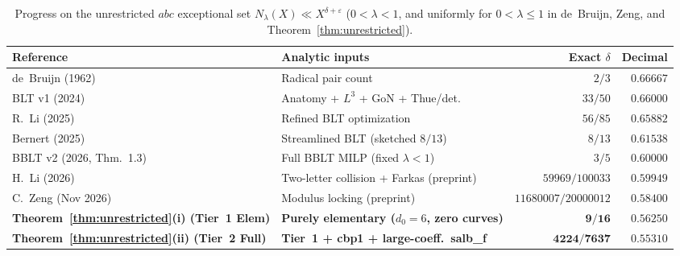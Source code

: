 \documentclass[11pt,a4paper]{amsart}
\theoremstyle{plain}
\theoremstyle{definition}
\theoremstyle{remark}
\newcommand{\eps}{\varepsilon}
\begin{document}
\begin{table}[ht]
\centering
\caption{Progress on the unrestricted $abc$ exceptional set $N_\lambda(X) \ll X^{\delta+\eps}$ ($0 < \lambda < 1$, and uniformly for $0 < \lambda \le 1$ in de~Bruijn, Zeng, and Theorem~\ref{thm:unrestricted}).}
\label{tab:history}
\footnotesize
\setlength{\tabcolsep}{2.8pt}
\begin{tabular}{@{}llrr@{}}
\toprule
Reference & Analytic inputs & Exact $\delta$ & Decimal \\
\midrule
de~Bruijn (1962)~\cite{deBruijn1962} & Radical pair count & $2/3$ & $0.66667$ \\
BLT v1 (2024)~\cite{BLTv1_2024} & Anatomy + $L^3$ + \textsf{GoN} + Thue/det. & $33/50$ & $0.66000$ \\
R.~Li (2025)~\cite{Li2025} & Refined BLT optimization & $56/85$ & $0.65882$ \\
Bernert (2025)~\cite{Bernert2025} & Streamlined BLT (sketched $8/13$) & $8/13$ & $0.61538$ \\
BBLT v2 (2026, Thm.~1.3)~\cite{BLT2026} & Full BBLT MILP (fixed $\lambda < 1$) & $3/5$ & $0.60000$ \\
H.~Li (2026)~\cite{HongminLi2026} & Two-letter collision + Farkas (preprint) & $59969/100033$ & $0.59949$ \\
C.~Zeng (Nov 2026)~\cite{Zeng2026} & Modulus locking (preprint) & $11680007/20000012$ & $0.58400$ \\
\midrule
\textbf{Theorem~\ref{thm:unrestricted}(i) (Tier~1 Elem)} & \textbf{Purely elementary ($d_0=6$, zero curves)} & $\mathbf{9/16}$ & $\mathbf{0.56250}$ \\
\textbf{Theorem~\ref{thm:unrestricted}(ii) (Tier~2 Full)} & \textbf{Tier~1 + \textsf{cbp1} + large-coeff.\ \textsf{salb\_f}} & $\mathbf{4224/7637}$ & $\mathbf{0.55310}$ \\
\bottomrule
\end{tabular}
\end{table}
\end{document}
